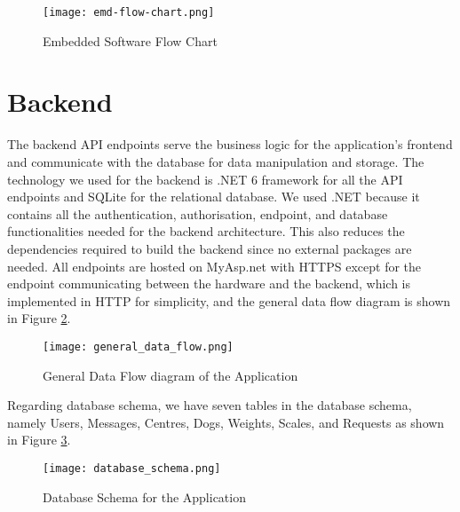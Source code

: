 \begin{figure}[!ht]
	\centering
	\texttt{[image: emd-flow-chart.png]}
	\caption{Embedded Software Flow Chart}
	\label{fig:emd_flow_chart}
\end{figure}



\section{Backend}
The backend API endpoints serve the business logic for the application's frontend and communicate with the database for data manipulation and storage. The technology we used for the backend is .NET 6 framework for all the API endpoints and SQLite for the relational database. We used .NET because it contains all the authentication, authorisation, endpoint, and database functionalities needed for the backend architecture. This also reduces the dependencies required to build the backend since no external packages are needed. All endpoints are hosted on MyAsp.net with HTTPS except for the endpoint communicating between the hardware and the backend, which is implemented in HTTP for simplicity, and the general data flow diagram is shown in Figure \ref{fig:general_data_flow}.


\begin{figure}[!ht]
	\centering
	\texttt{[image: general\_data\_flow.png]}
	\caption{General Data Flow diagram of the Application}
	\label{fig:general_data_flow}
\end{figure}

Regarding database schema, we have seven tables in the database schema, namely Users, Messages, Centres, Dogs, Weights, Scales, and Requests as shown in Figure \ref{fig:database_schema}.  

\begin{figure}[!ht]
	\centering
	\texttt{[image: database\_schema.png]}
	\caption{Database Schema for the Application}
	\label{fig:database_schema}
\end{figure}

